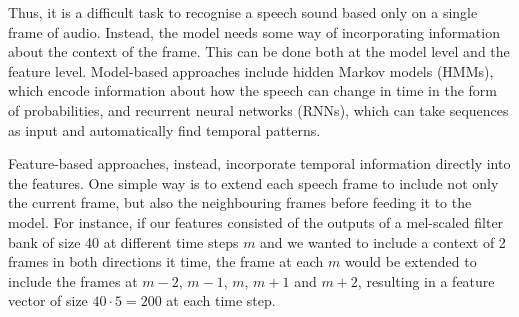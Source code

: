 Thus, it is a difficult task to recognise a speech sound based only on a single frame of audio.
Instead, the model needs some way of incorporating information about the context of the frame.
This can be done both at the model level and the feature level.
Model-based approaches include hidden Markov models (HMMs), which encode information about how the speech can change in time in the form of probabilities, and recurrent neural networks (RNNs), which can take sequences as input and automatically find temporal patterns.

Feature-based approaches, instead, incorporate temporal information directly into the features.
One simple way is to extend each speech frame to include not only the current frame, but also the neighbouring frames before feeding it to the model.
For instance, if our features consisted of the outputs of a mel-scaled filter bank of size 40 at different time steps $m$ and we wanted to include a context of 2 frames in both directions it time, the frame at each $m$ would be extended to include the frames at $m-2$, $m-1$, $m$, $m+1$ and $m+2$, resulting in a feature vector of size $40\cdot5 = 200$ at each time step.



